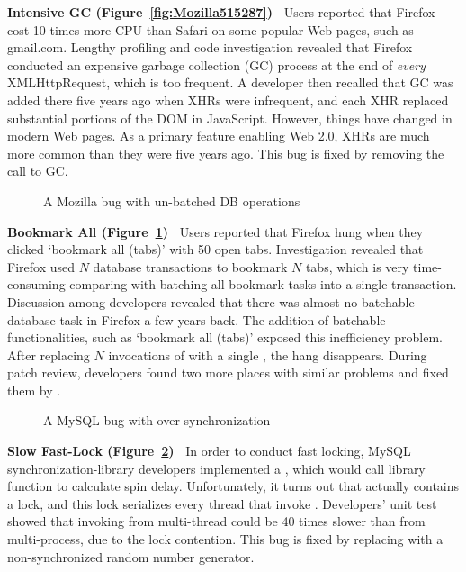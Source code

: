 {\bf Intensive GC (Figure~\ref{fig:Mozilla515287})\ }
Users reported that Firefox cost 10 times more CPU than Safari on
some popular Web pages, such as gmail.com.
Lengthy profiling and code investigation revealed that
Firefox conducted an expensive
garbage collection (GC) process at the end of {\it every}
XMLHttpRequest, which is too frequent.
A developer then recalled that GC was added there
five years ago when
XHRs were infrequent, and each XHR replaced substantial portions of the 
DOM in JavaScript. However, things have changed in modern Web pages.
As a primary feature enabling Web 2.0, 
XHRs are much more common 
than they were five years ago.
This bug is fixed by removing the call to GC.

\begin{figure}
\caption{A Mozilla bug with un-batched DB operations}
\label{fig:Mozilla490742}
\end{figure}

{\bf Bookmark All (Figure~\ref{fig:Mozilla490742})\ }
Users reported that Firefox hung when they clicked `bookmark all (tabs)'
with 50 open tabs.
Investigation revealed that Firefox used $N$ database transactions to bookmark
$N$ tabs, which is very time-consuming comparing with batching all bookmark
tasks into a single transaction.
Discussion among developers revealed that
there was almost no batchable database task in Firefox a few years back.  
The addition of batchable
functionalities, such as `bookmark all (tabs)' exposed this inefficiency
problem.
After replacing $N$ invocations of 
 with a single , the hang disappears.
During patch review, developers found two more places
with similar problems and fixed them by .

\begin{figure}
\caption{A MySQL bug with over synchronization}
\label{fig:MySQL38941}
\end{figure}

{\bf Slow Fast-Lock (Figure~\ref{fig:MySQL38941})\ }
In order to conduct fast locking, 
MySQL synchronization-library developers implemented a , 
which would call library function  to calculate spin delay. 
Unfortunately, it turns out that  actually contains a lock, 
and this lock serializes every thread that invoke . 
Developers' unit test showed that invoking  
from multi-thread could be 40 times slower than from multi-process, 
due to the lock contention. 
This bug is fixed by replacing  with a non-synchronized random number generator.


